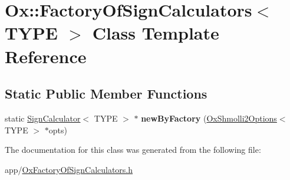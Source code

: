 \hypertarget{class_ox_1_1_factory_of_sign_calculators}{\section{Ox\-:\-:Factory\-Of\-Sign\-Calculators$<$ T\-Y\-P\-E $>$ Class Template Reference}
\label{class_ox_1_1_factory_of_sign_calculators}
}
\subsection*{Static Public Member Functions}
\begin{DoxyCompactItemize}
\item 
\hypertarget{class_ox_1_1_factory_of_sign_calculators_a51e4f2a504fd3cc9031cd52acebde5e7}{static \hyperlink{class_ox_1_1_sign_calculator}{Sign\-Calculator}$<$ T\-Y\-P\-E $>$ $\ast$ {\bfseries new\-By\-Factory} (\hyperlink{struct_ox_1_1_ox_shmolli2_options}{Ox\-Shmolli2\-Options}$<$ T\-Y\-P\-E $>$ $\ast$opts)}\label{class_ox_1_1_factory_of_sign_calculators_a51e4f2a504fd3cc9031cd52acebde5e7}

\end{DoxyCompactItemize}


The documentation for this class was generated from the following file\-:\begin{DoxyCompactItemize}
\item 
app/\hyperlink{_ox_factory_of_sign_calculators_8h}{Ox\-Factory\-Of\-Sign\-Calculators.\-h}\end{DoxyCompactItemize}
